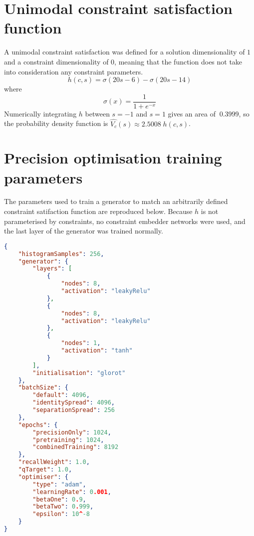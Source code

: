 \documentclass[../main.tex]{subfiles}
\begin{document}
\section{Unimodal constraint satisfaction function} \label{appendix:unimodalCSF}

A unimodal constraint satisfaction was defined for a solution dimensionality of $1$ and a constraint dimensionality of $0$, meaning that the function does not take into consideration any constraint parameters.
\begin{equation}
    h(c,s)=\sigma(20s-6)-\sigma(20s-14)
\end{equation}
where
\begin{equation}
    \sigma(x)=\frac{1}{1+e^{-x}}
\end{equation}
Numerically integrating $h$ between $s=-1$ and $s=1$ gives an area of $~0.3999$, so the probability density function is $\hat{V_c}(s)\approx2.5008\;h(c,s)$.

\section{Precision optimisation training parameters} \label{appendix:precisionOptimisationTrainingParameters}

The parameters used to train a generator to match an arbitrarily defined constraint satifaction function are reproduced below.
Because $h$ is not parameterised by constraints, no constraint embedder networks were used, and the last layer of the generator was trained normally.

\begin{lstlisting}[language=json,firstnumber=1,caption={Experimental parameters for training a generator to match an arbitrary constraint satisfaction function with no constraint inputs.},captionpos=b]
{
    "histogramSamples": 256,
    "generator": {
        "layers": [
            {
                "nodes": 8,
                "activation": "leakyRelu"
            },
            {
                "nodes": 8,
                "activation": "leakyRelu"
            },
            {
                "nodes": 1,
                "activation": "tanh"
            }
        ],
        "initialisation": "glorot"
    },
    "batchSize": {
        "default": 4096,
        "identitySpread": 4096,
        "separationSpread": 256
    },
    "epochs": {
        "precisionOnly": 1024,
        "pretraining": 1024,
        "combinedTraining": 8192
    },
    "recallWeight": 1.0,
    "qTarget": 1.0,
    "optimiser": {
        "type": "adam",
        "learningRate": 0.001,
        "betaOne": 0.9,
        "betaTwo": 0.999,
        "epsilon": 10^-8
    }
}
\end{lstlisting}
\end{document}
